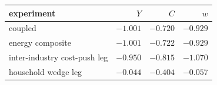 \begin{tabular}{@{}lrrr@{}}
\toprule
experiment & $Y$ & $C$ & $w$ \\
\midrule
coupled                         & $-1.001$ & $-0.720$ & $-0.929$ \\
energy composite                & $-1.001$ & $-0.722$ & $-0.929$ \\
inter-industry cost-push leg    & $-0.950$ & $-0.815$ & $-1.070$ \\
household wedge leg             & $-0.044$ & $-0.404$ & $-0.057$ \\
\bottomrule
\end{tabular}
